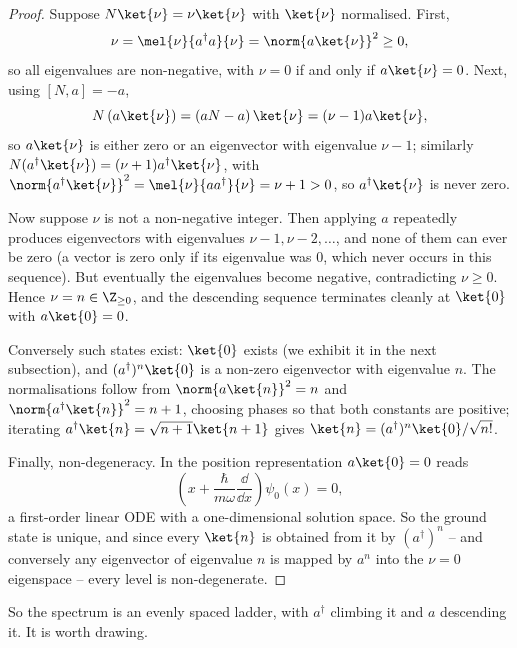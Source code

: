 \begin{proof}
    Suppose $N\ket{\nu} = \nu \ket{\nu}$ with $\ket{\nu}$ normalised. First,
    $$
    \nu = \mel{\nu}{a^\dagger a}{\nu} = \norm{a\ket{\nu}}^2 \geq 0,
    $$
    so all eigenvalues are non-negative, with $\nu = 0$ if and only if $a \ket{\nu} = 0$. Next, using $[N,a] = -a$,
    $$
    N \left( a \ket{\nu} \right) = \left( aN - a \right)\ket{\nu} = (\nu - 1) a\ket{\nu},
    $$
    so $a\ket{\nu}$ is either zero or an eigenvector with eigenvalue $\nu - 1$; similarly $N(a^\dagger \ket{\nu}) = (\nu+1)a^\dagger\ket{\nu}$, with $\norm{a^\dagger\ket{\nu}}^2 = \mel{\nu}{aa^\dagger}{\nu} = \nu + 1 > 0$, so $a^\dagger \ket{\nu}$ is never zero.

    Now suppose $\nu$ is not a non-negative integer. Then applying $a$ repeatedly produces eigenvectors with eigenvalues $\nu - 1, \nu - 2, \dots$, and none of them can ever be zero (a vector is zero only if its eigenvalue was $0$, which never occurs in this sequence). But eventually the eigenvalues become negative, contradicting $\nu \geq 0$. Hence $\nu = n \in \Z_{\geq 0}$, and the descending sequence terminates cleanly at $\ket{0}$ with $a\ket{0} = 0$.

    Conversely such states exist: $\ket{0}$ exists (we exhibit it in the next subsection), and $(a^\dagger)^n\ket{0}$ is a non-zero eigenvector with eigenvalue $n$. The normalisations follow from $\norm{a\ket{n}}^2 = n$ and $\norm{a^\dagger \ket{n}}^2 = n+1$, choosing phases so that both constants are positive; iterating $a^\dagger\ket{n} = \sqrt{n+1}\ket{n+1}$ gives $\ket{n} = (a^\dagger)^n\ket{0}/\sqrt{n!}$.

    Finally, non-degeneracy. In the position representation $a\ket{0} = 0$ reads
    $$
    \left( x + \frac{\hbar}{m\omega}\frac{\dd}{\dd x} \right)\psi_0(x) = 0,
    $$
    a first-order linear ODE with a one-dimensional solution space. So the ground state is unique, and since every $\ket{n}$ is obtained from it by $(a^\dagger)^n$ -- and conversely any eigenvector of eigenvalue $n$ is mapped by $a^n$ into the $\nu = 0$ eigenspace -- every level is non-degenerate.
\end{proof}

So the spectrum is an evenly spaced ladder, with $a^\dagger$ climbing it and $a$ descending it. It is worth drawing.

